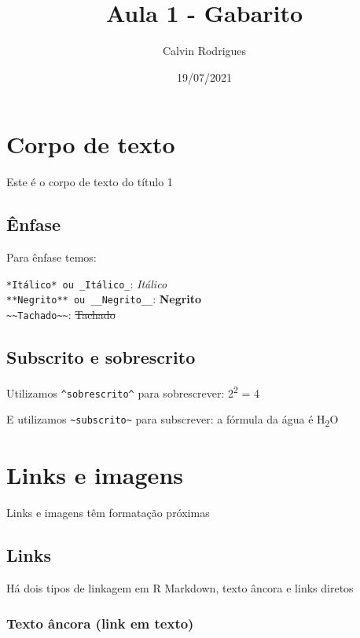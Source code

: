 \documentclass[
]{article}
\title{Aula 1 - Gabarito}
\author{Calvin Rodrigues}
\date{19/07/2021}
\begin{document}
\maketitle

\section{Corpo de texto}\label{corpo-de-texto}

Este é o corpo de texto do título 1

\subsection{Ênfase}\label{uxeanfase}

Para ênfase temos:

\texttt{*Itálico*\ ou\ \_Itálico\_}: \emph{Itálico}\\
\texttt{**Negrito**\ ou\ \_\_Negrito\_\_}: \textbf{Negrito}\\
\texttt{\textasciitilde{}\textasciitilde{}Tachado\textasciitilde{}\textasciitilde{}}:
\st{Tachado}

\subsection{Subscrito e sobrescrito}\label{subscrito-e-sobrescrito}

Utilizamos \texttt{\^{}sobrescrito\^{}} para sobrescrever:
2\textsuperscript{2} = 4

E utilizamos \texttt{\textasciitilde{}subscrito\textasciitilde{}} para
subscrever: a fórmula da água é H\textsubscript{2}O

\section{Links e imagens}\label{links-e-imagens}

Links e imagens têm formatação próximas

\subsection{Links}\label{links}

Há dois tipos de linkagem em R Markdown, texto âncora e links diretos

\subsubsection{Texto âncora (link em
texto)}\label{texto-uxe2ncora-link-em-texto}
\end{document}
